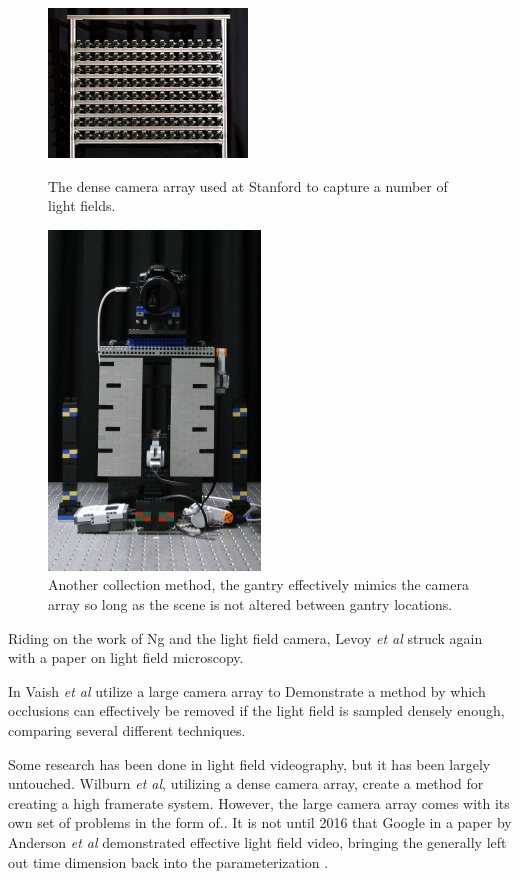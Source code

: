 \documentclass[12pt]{report}
\begin{document}
\begin{figure}[!ht]
	\centering
	\begin{minipage}{0.45\textwidth}
		\centering
		\includegraphics[scale=0.9]{stanford_camera_array.png}
		\caption{The dense camera array used at Stanford to capture a number of light fields.}
		\label{fig:camera_array}
	\end{minipage}\hfill
	\begin{minipage}{0.45\textwidth}
		\centering
		\includegraphics[scale=0.5]{lego_gantry.jpg}
		\caption{Another collection method, the gantry effectively mimics the camera array so long as the scene is not altered between gantry locations.}
		\label{fig:lego_gantry}
	\end{minipage}
\end{figure}

Riding on the work of Ng and the light field camera, Levoy \emph{et al} struck again with a paper on light field microscopy.\cite{Levoy06b}

In \cite{Vaish06} Vaish \emph{et al} utilize a large camera array to Demonstrate a method by which occlusions can effectively be removed if the light field is sampled densely enough, comparing several different techniques.

Some research has been done in light field videography, but it has been largely untouched. Wilburn \emph{et al}, utilizing a dense camera array, create a method for creating a high framerate system. However, the large camera array comes with its own set of problems in the form of.. It is not until 2016 that Google in a paper by Anderson \emph{et al} demonstrated effective light field video, bringing the generally left out time dimension back into the parameterization \cite{Anderson16}. 
\end{document}
